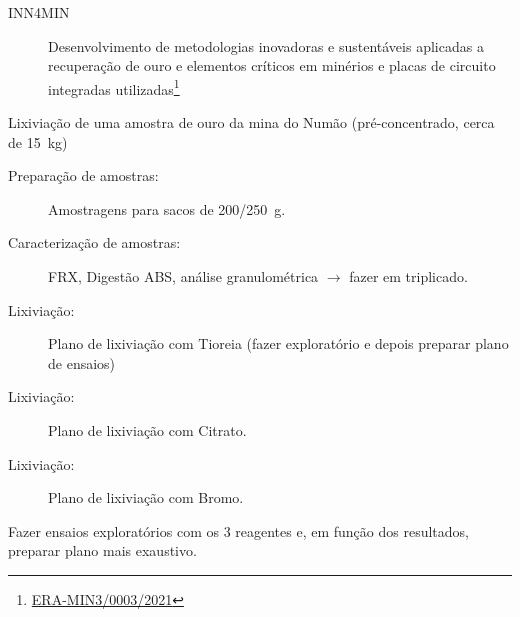 \thispagestyle{empty}
	\vspace*{\fill}
	\begin{projects}
		\begin{description}
			\item [INN4MIN] Desenvolvimento de metodologias inovadoras e sustentáveis aplicadas a recuperação de ouro e elementos críticos em minérios e placas de circuito integradas utilizadas\footnote{\href{https://cerena.pt/projects/inn4min-development-innovative-and-sustainable-approaches-applied-recovery-gold-and-1}{ERA-MIN3/0003/2021}}
		\end{description}
	\end{projects}

	\begin{planos}
		Lixiviação de uma amostra de ouro da mina do Numão (pré-concentrado, cerca de 15~kg)
		\begin{description}
			\item [Preparação de amostras:] Amostragens para sacos de 200/250~g.
			\item [Caracterização de amostras:] FRX, Digestão ABS, análise granulométrica $\rightarrow$ fazer em triplicado.
			\item [Lixiviação:] Plano de lixiviação com Tioreia (fazer exploratório e depois preparar plano de ensaios)
			\item [Lixiviação:] Plano de lixiviação com Citrato.
			\item [Lixiviação:] Plano de lixiviação com Bromo.
		\end{description}
		Fazer ensaios exploratórios com os 3 reagentes e, em função dos resultados, preparar plano mais exaustivo.
	\end{planos}

	\vspace*{\fill}